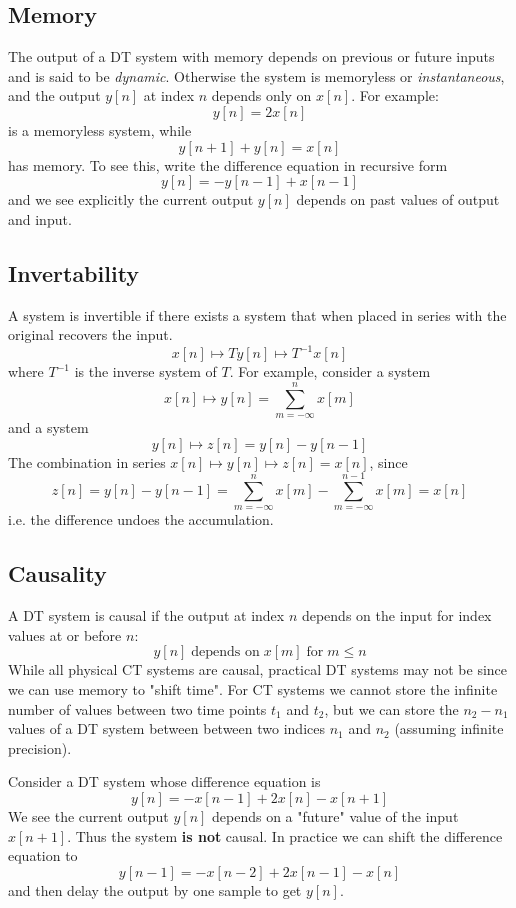 \subsection{Memory}
The output of a DT system with memory depends on previous or future inputs and is said to be {\it dynamic}. Otherwise the system is memoryless or {\it instantaneous}, and the output $y[n]$ at index $n$ depends only on $x[n]$.
For example:
\[
y[n] = 2x[n]
\]
is a memoryless system, while
\[
y[n+1] + y[n] = x[n]
\]
has memory. To  see this, write the difference equation in recursive form
\[
y[n] = -y[n-1] + x[n-1]
\]
and we see explicitly the current output $y[n]$ depends on past values of output and input.

\subsection{Invertability}

A system is invertible if there exists a system that when placed in series with the original recovers the input.
\[
x[n] \mapsto{T} y[n] \mapsto{T^{-1}} x[n]
\]
where $T^{-1}$ is the inverse system of $T$. For example, consider a system
\[
x[n] \mapsto y[n] = \sum\limits_{m=-\infty}^{n} x[m]
\]
and a system
\[
y[n] \mapsto z[n] = y[n] - y[n-1]
\]
The combination in series $x[n] \mapsto y[n] \mapsto z[n] = x[n]$, since
\[
z[n] = y[n] - y[n-1] = \sum\limits_{m=-\infty}^{n} x[m] - \sum\limits_{m=-\infty}^{n-1} x[m] = x[n]
\]
i.e. the difference undoes the accumulation.

\subsection{Causality}
A DT system is causal if the output at index $n$ depends on the input for index values at or before $n$:
\[
y[n] \;\text{depends on}\; x[m] \;\text{for} \; m \leq n
\]
While all physical CT systems are causal, practical DT systems may not be since we can use memory to "shift time". For CT systems we cannot store the infinite number of values between two time points $t_1$ and $t_2$, but we can store the $n_2-n_1$ values of a DT system between between two indices $n_1$ and $n_2$ (assuming infinite precision).

\begin{example}
Consider a DT system whose difference equation is
\[
y[n] = -x[n-1] + 2x[n] - x[n+1]
\]
We see the current output $y[n]$ depends on a "future" value of the input $x[n+1]$. Thus the system \textbf{is not} causal. In practice we can shift the difference equation to
\[
y[n-1] = -x[n-2] + 2x[n-1] - x[n]
\]
and then delay the output by one sample to get $y[n]$.
\end{example}

